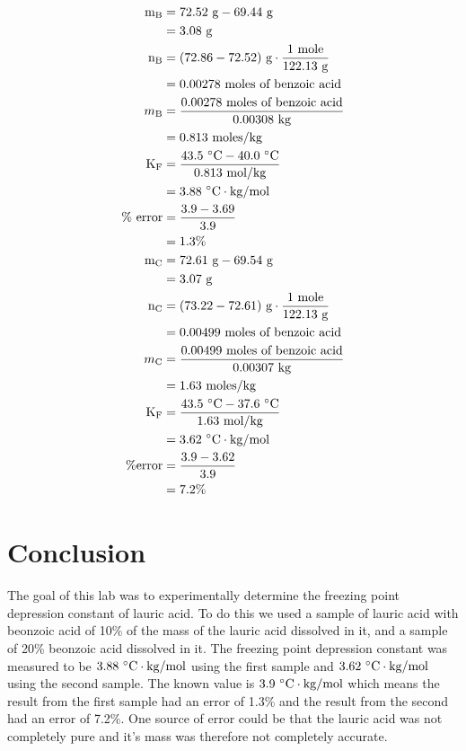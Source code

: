 \documentclass[12pt]{article}\usepackage[]{graphicx}\usepackage[]{xcolor}
\begin{document}
    \begin{align*}
        \text{m}_\text{B} &= 72.52 \text{ g} - 69.44 \text{ g}\\
        &= 3.08 \text{ g}\\
        \text{n}_\text{B} &= (72.86-72.52) \text{ g} \cdot \frac{1 \text{ mole}}{122.13 \text{ g}}\\
        &= 0.00278~\text{moles of benzoic acid}\\
        m_\mathrm{B} &= \frac{0.00278~\text{moles of benzoic acid}}{0.00308\text{ kg}}\\
        &= 0.813 \text{ moles/kg}\\
        \mathrm{K_F} & = \frac{43.5~\mathrm{\degree C} - 40.0~\mathrm{\degree C}}{0.813 \text{ mol/kg}}\\
        &= 3.88~\mathrm{\degree C\cdot kg / mol}\\
        \text{\% error} &= \frac{3.9-3.69}{3.9}\\
        &=1.3\%\\
        \text{m}_\text{C} &= 72.61 \text{ g} - 69.54 \text{ g}\\
        &= 3.07 \text{ g}\\
        \text{n}_\text{C} &= (73.22-72.61) \text{ g} \cdot \frac{1 \text{ mole}}{122.13 \text{ g}}\\
        &= 0.00499~\text{moles of benzoic acid}\\
        m_\mathrm{C} &= \frac{0.00499~\text{moles of benzoic acid}}{0.00307\text{ kg}}\\
        &= 1.63 \text{ moles/kg}\\
        \mathrm{K_F} & = \frac{43.5~\mathrm{\degree C} - 37.6~\mathrm{\degree C}}{1.63 \text{ mol/kg}}\\
        &= 3.62~\mathrm{\degree C\cdot kg / mol}\\
        \text{\%error} &= \frac{3.9-3.62}{3.9}\\
        &= 7.2\%
    \end{align*}
    \section*{Conclusion}
      The goal of this lab was to experimentally determine the freezing point depression constant of lauric acid. To do this we used a sample of lauric acid with beonzoic acid of 10\% of the mass of the lauric acid dissolved in it, and a sample of 20\% beonzoic acid dissolved in it. The freezing point depression constant was measured to be \(3.88~\mathrm{\degree C\cdot kg / mol}\) using the first sample and \(3.62~\mathrm{\degree C\cdot kg / mol}\) using the second sample. The known value is \(3.9~\mathrm{\degree C\cdot kg / mol}\) which means the result from the first sample had an error of 1.3\% and the result from the second had an error of 7.2\%. One source of error could be that the lauric acid was not completely pure and it's mass was therefore not completely accurate.
\end{document}
